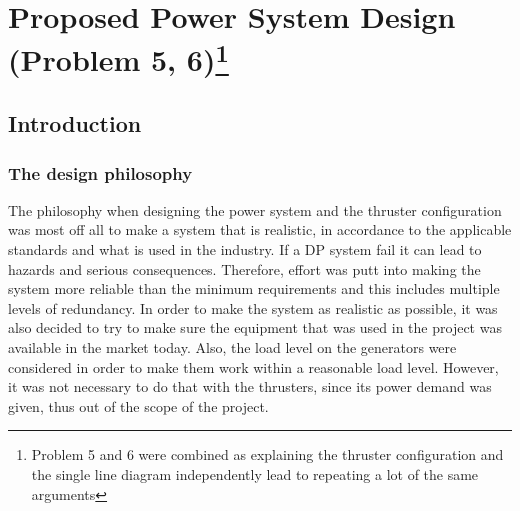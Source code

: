 \newpage
\section{Proposed Power System Design (Problem 5, 6)\footnote{Problem 5 and 6 were combined as explaining the thruster configuration and the single line diagram independently lead to repeating a lot of the same arguments}} \label{prob_5and6}


\subsection{Introduction}
\subsubsection{The design philosophy}\label{Sec:designPhilosophy}
The philosophy when designing the power system and the thruster configuration was most off all to make a system that is realistic, in accordance to the applicable standards and what is used in the industry. If a DP system fail it can lead to hazards and serious consequences. Therefore, effort was putt into making the system more reliable than the minimum requirements and this includes multiple levels of redundancy. In order to make the system as realistic as possible, it was also decided to try to make sure the equipment that was used in the project was available in the market today. Also, the load level on the generators were considered in order to make them work within a reasonable load level. However, it was not necessary to do that with the thrusters, since its power demand was given, thus out of the scope of the project. 


